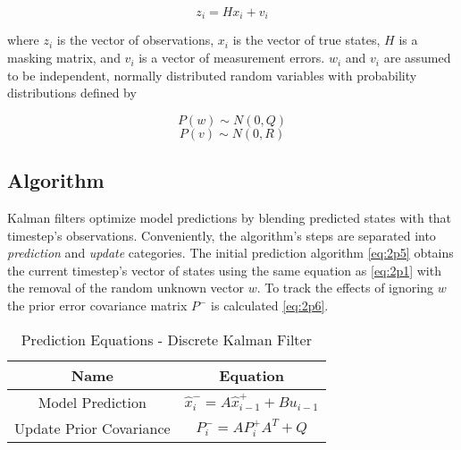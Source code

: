 \begin{large}
\begin{equation}\label{eq:2p2}
z_{i} = Hx_{i} + v_{i}
\end{equation}
\end{large}

where $z_{i}$ is the vector of observations, $x_{i}$ is the vector of true states, $H$ is a masking matrix, and $v_{i}$ is a vector of measurement errors. $w_{i}$ and $v_{i}$ are assumed to be independent, normally distributed random variables with probability distributions defined by

\begin{large}
\begin{equation}\label{eq:2p3}
P(w) \sim N(0,Q)
\end{equation}
\begin{equation}\label{eq:2p4}
P(v) \sim N(0,R)
\end{equation}
\end{large}

\subsection{Algorithm}

Kalman filters optimize model predictions by blending predicted states with that timestep's observations. Conveniently, the algorithm's steps are separated into \textit{prediction} and \textit{update} categories. The initial prediction algorithm \eqref{eq:2p5} obtains the current timestep's vector of states using the same equation as \eqref{eq:2p1} with the removal of the random unknown vector $w$. To track the effects of ignoring $w$ the prior error covariance matrix $P^{-}$ is calculated \eqref{eq:2p6}.

\begin{table}[h]
\caption{Prediction Equations - Discrete Kalman Filter} 
\centering
\begin{tabular}{c c}
\\ [0.1ex] 
\hline   
Name & Equation \\
\hline
Model Prediction & \parbox{3cm}{\begin{equation}\label{eq:2p5} \hat{x}^{-}_{i} = A\hat{x}^{+}_{i-1} + Bu_{i-1} \end{equation}} \\
Update Prior Covariance & \parbox{3cm}{\begin{equation}\label{eq:2p6} P^{-}_{i} = AP^{+}_{i}A^{T}+Q \end{equation}}
\end{tabular}
\label{tab:hresult}
\end{table}

